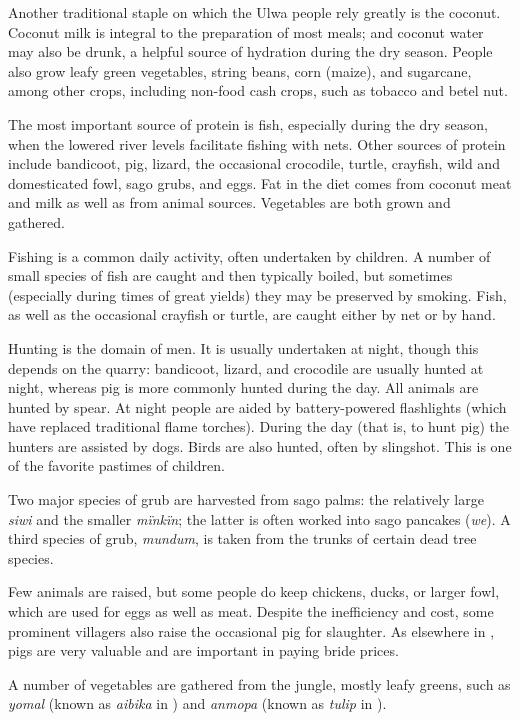 Another traditional staple on which the Ulwa people rely greatly is the coconut. Coconut milk is integral to the preparation of most meals; and coconut water may also be drunk, a helpful source of hydration during the dry season. People also grow leafy green vegetables, string beans, corn (maize), and sugarcane, among other crops, including non-food cash crops, such as tobacco and betel nut.

The most important source of protein is fish, especially during the dry season, when the lowered river levels facilitate fishing with nets. Other sources of protein include bandicoot, pig, lizard, the occasional crocodile, turtle, crayfish, wild and domesticated fowl, sago grubs, and eggs. Fat in the diet comes from coconut meat and milk as well as from animal sources. Vegetables are both grown and gathered.

Fishing is a common daily activity, often undertaken by children. A number of small species of fish are caught and then typically boiled, but sometimes (especially during times of great yields) they may be preserved by smoking. Fish, as well as the occasional crayfish or turtle, are caught either by net or by hand.

Hunting is the domain of men. It is usually undertaken at night, though this depends on the quarry: bandicoot, lizard, and crocodile are usually hunted at night, whereas pig is more commonly hunted during the day. All animals are hunted by spear. At night people are aided by battery-powered flashlights (which have replaced traditional flame torches). During the day (that is, to hunt pig) the hunters are assisted by dogs. Birds are also hunted, often by slingshot. This is one of the favorite pastimes of children.

Two major species of grub are harvested from sago palms: the relatively large \textit{siwi} and the smaller \textit{mïnkïn}; the latter is often worked into sago pancakes (\textit{we}). A third species of grub, \textit{mundum}, is taken from the trunks of certain dead tree species.

Few animals are raised, but some people do keep chickens, ducks, or larger fowl, which are used for eggs as well as meat. Despite the inefficiency and cost, some prominent villagers also raise the occasional pig for slaughter. As elsewhere in , pigs are very valuable and are important in paying bride prices.

A number of vegetables are gathered from the jungle, mostly leafy greens, such as \textit{yomal} (known as \textit{aibika} in ) and \textit{anmopa} (known as \textit{tulip} in ).

